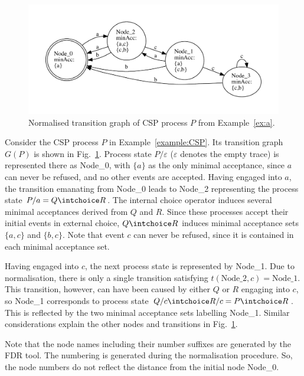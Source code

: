  \begin{figure}[t]
   \begin{center}
     \includegraphics[width=\textwidth]{q0.pdf}
   \end{center}
   \caption{Normalised transition graph of CSP process $P$ from Example~\ref{ex:a}.}
   \label{fig:tga}
 \end{figure}

\begin{example}\label{ex:a}
Consider the CSP process $P$ in Example~\ref{example:CSP}. Its transition
graph $G(P)$ is shown in Fig.~\ref{fig:tga}. Process state $P/\varepsilon$ 
($\varepsilon$ denotes the empty trace)
is represented there as Node\_0, with $\{ a\}$ as the only minimal
acceptance, since $a$ can never be refused, and no other events are accepted.
Having engaged into $a$, the transition emanating from Node\_0 leads to
Node\_2 representing  the process state $P/a = Q\intchoice R$. The internal
choice operator induces several minimal acceptances derived from $Q$ and $R$.
Since these processes accept their initial events in external choice,
$Q\intchoice R$ induces minimal acceptance sets $\{a,c\}$ and $\{b,c\}$. Note
that event $c$ can never be refused, since it is contained in each minimal
acceptance set.

Having engaged into $c$, the next process state is represented by Node\_1.
Due to normalisation, there is only a single transition satisfying
$t(\text{Node\_2},c) = \text{Node\_1}$. This transition, however, can have
been caused by either $Q$ or $R$ engaging into $c$, so Node\_1 corresponds to
process state $Q/c \intchoice R/c = P \intchoice R$. This is reflected by the
two minimal acceptance sets labelling Node\_1.
Similar considerations explain the other nodes and transitions in
Fig.~\ref{fig:tga}.

Note that the node names including their number suffixes are generated by the
FDR tool. The numbering is generated during the normalisation procedure. So,
the node numbers do not reflect the distance from the initial node Node\_0.
\xbox
\end{example}

